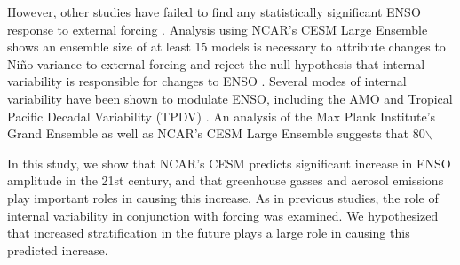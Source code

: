 \message{ !name(papernew.tex)}\documentclass[11pt]{article}
\begin{document}
However, other studies have failed to find any statistically significant ENSO response to external forcing \citep{stevenson2012significant}. Analysis using NCAR's CESM Large Ensemble shows an ensemble size of at least 15 models is necessary to attribute changes to Niño variance to external forcing and reject the null hypothesis that internal variability is responsible for changes to ENSO \citep{zheng2018response}. Several modes of internal variability have been shown to modulate ENSO, including the AMO \citep{levine2017impact} and Tropical Pacific Decadal Variability (TPDV) \citep{zheng2018response}. An analysis of the Max Plank Institute's Grand Ensemble as well as NCAR's CESM Large Ensemble suggests that 80$\backslash$%

In this study, we show that NCAR's CESM predicts significant increase in ENSO amplitude in the 21st century, and that greenhouse gasses and aerosol emissions play important roles in causing this increase. As in previous studies, the role of internal variability in conjunction with forcing was examined. We hypothesized that increased stratification in the future plays a large role in causing this predicted increase.


\end{document}
